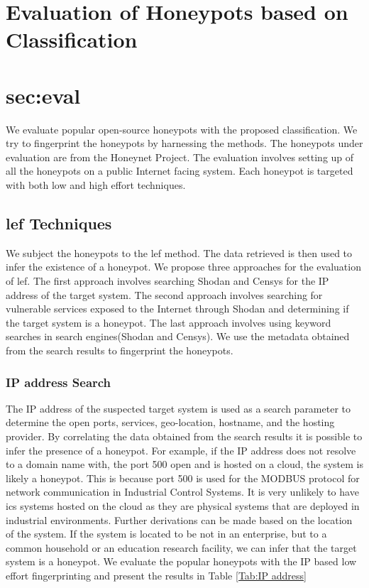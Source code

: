 \section{Evaluation of Honeypots based on Classification}
\section{sec:eval}

We evaluate popular open-source honeypots with the proposed classification. We try to fingerprint the honeypots by harnessing the methods. The honeypots under evaluation are from the Honeynet Project. The evaluation involves setting up of all the honeypots on a public Internet facing system. Each honeypot is targeted with both low and high effort techniques. 
 
\subsection{\acrfull{lef} Techniques}
 We subject the honeypots to the \acrshort{lef} method. The data retrieved is then used to infer the existence of a honeypot. We propose three approaches for the evaluation of \acrshort{lef}. The first approach involves searching Shodan and Censys for the IP address of the target system. The second approach involves searching for vulnerable services exposed to the Internet through Shodan and determining if the target system is a honeypot. The last approach involves using keyword searches in search engines(Shodan and Censys). We use the metadata obtained from the search results to fingerprint the honeypots. 
 
 \subsubsection{IP address Search}
The IP address of the suspected target system is used as a search parameter to determine the open ports, services, geo-location, hostname, and the hosting provider. By correlating the data obtained from the search results it is possible to infer the presence of a honeypot. For example, if the IP address does not resolve to a domain name with, the port 500 open and is hosted on a cloud, the system is likely a honeypot. This is because port 500 is used for the MODBUS protocol for network communication in Industrial Control Systems. It is very unlikely to have \acrshort{ics} systems hosted on the cloud as they are physical systems that are deployed in industrial environments.  Further derivations can be made based on the location of the system. If the system is located to be not in an enterprise, but to a common household or an education research facility, we can infer that the target system is a honeypot. We  evaluate the popular honeypots with the IP based low effort fingerprinting and present the results in Table \ref{Tab:IP address}

